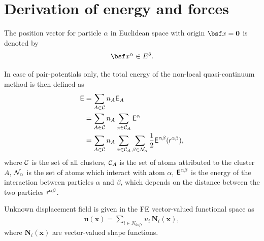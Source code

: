 \documentclass[a4paper,10pt]{article}
\def\gz  #1{           \mbox{$\mathbf{#1}$}}
\def\msf  #1{           \mbox{\!\!      $\sf #1$}}
\def\mcl  #1{               {\cal #1}}
\begin{document}
\section{Derivation of energy and forces}
The position vector for particle $\alpha$ in Euclidean space with origin $\bsf x = \gz 0$ is denoted by
\begin{align}
\bsf x^\alpha \in  E^3.
\end{align}

In case of pair-potentials only, the total energy of the non-local quasi-continuum method is then defined as
\begin{align}
\begin{split}
\msf E &= \sum_{A \in \mcl C} n_A \msf E_A \\
           &= \sum_{A \in \mcl C} n_A \sum_{\alpha \in \mcl C_A} \msf E^\alpha \\
           &= \sum_{A \in \mcl C} n_A \sum_{\alpha \in \mcl C_A} \sum_{\beta \in \mcl N_\alpha} \frac{1}{2} \msf E^{\alpha \beta} (\msf r^{\alpha\beta}),
\end{split}
\end{align}
where $\mcl C$ is the set of all clusters, $\mcl C_A$ is the set of atoms attributed to the cluster $A$, $\mcl N_\alpha$ is the set of atoms which interact with atom $\alpha$,
$\msf E^{\alpha \beta}$ is the energy of the interaction between particles $\alpha$ and $\beta$, which depends on the distance between the two particles $\msf r^{\alpha\beta}$.

Unknown displacement field is given in the FE vector-valued functional space as
\begin{align}
\gz u (\gz x) = \sum_{i \in N_{dofs}} u_i \, \gz N_i (\gz x),
\end{align}
where $\gz N_i (\gz x)$ are vector-valued shape functions.
\end{document}
